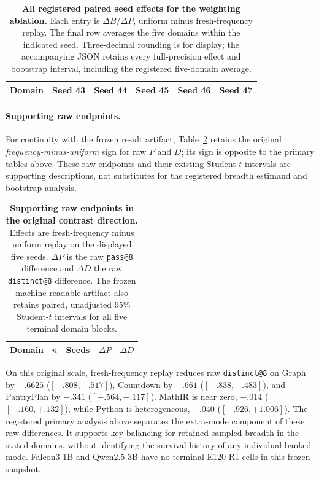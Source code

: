 \begin{table}[H]
  \centering
  \caption{\textbf{All registered paired seed effects for the weighting ablation.}
  Each entry is $\Delta B/\Delta P$, uniform minus fresh-frequency replay.
  The final row averages the five domains within the indicated seed.
  Three-decimal rounding is for display; the accompanying JSON retains
  every full-precision effect and bootstrap interval, including the registered
  five-domain average.}
  \label{tab:e120-primary-seeds}
  \scriptsize
  \setlength{\tabcolsep}{3pt}
  \begin{tabular}{@{}lrrrrr@{}}
    \toprule
    \textbf{Domain} & \textbf{Seed 43} & \textbf{Seed 44}
      & \textbf{Seed 45} & \textbf{Seed 46} & \textbf{Seed 47} \\
    \midrule
    
  \end{tabular}
\end{table}

\paragraph{Supporting raw endpoints.}
For continuity with the frozen result artifact,
Table~\ref{tab:e120-frequency-progress} retains the original
\emph{frequency-minus-uniform} sign for raw $P$ and $D$; its sign is opposite
to the primary tables above. These raw endpoints and their existing
Student-$t$ intervals are supporting descriptions, not substitutes for the
registered breadth estimand and bootstrap analysis.

\begin{table}[H]
  \centering
  \caption{\textbf{Supporting raw endpoints in the original contrast direction.}
  Effects are fresh-frequency minus uniform replay on the displayed five
  seeds. $\Delta P$ is the raw \texttt{pass@8} difference and $\Delta D$ the
  raw \texttt{distinct@8} difference. The frozen machine-readable artifact
  also retains paired, unadjusted 95\% Student-$t$ intervals for all five
  terminal domain blocks.}
  \label{tab:e120-frequency-progress}
  \small
  \begin{tabular}{@{}lrrrr@{}}
    \toprule
    \textbf{Domain} & $n$ & \textbf{Seeds} & $\Delta P$ & $\Delta D$ \\
    \midrule
    
  \end{tabular}
\end{table}

On this original scale, fresh-frequency replay reduces raw
\texttt{distinct@8} on Graph by $-.6625$ ($[-.808,-.517]$), Countdown by
$-.661$ ($[-.838,-.483]$), and PantryPlan by $-.341$ ($[-.564,-.117]$).
MathIR is near zero, $-.014$ ($[-.160,+.132]$), while Python is heterogeneous,
$+.040$ ($[-.926,+1.006]$). The registered primary analysis above separates
the extra-mode component of these raw differences. It supports key balancing
for retained sampled breadth in the stated domains, without identifying the
survival history of any individual banked mode. Falcon3-1B and Qwen2.5-3B
have no terminal E120-R1 cells in this frozen snapshot.

